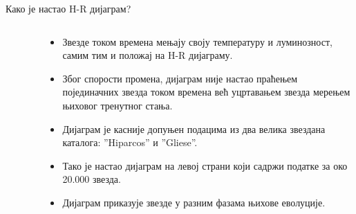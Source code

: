 \documentclass[aspectratio=169, xcolor=table, 10pt]{beamer}
\theoremstyle{definition}
\begin{document}
\begin{frame}{Како је настао H-R дијаграм?}
  \begin{columns}[T]
    \begin{column}{0.4\textwidth}
      \begin{figure}
        \centering
        \vspace{-1em}
      \end{figure}
    \end{column}
    \begin{column}{0.6\textwidth}
      \begin{itemize}
        \item Звезде током времена мењају своју температуру и луминозност, самим тим и положај на H-R дијаграму.
        \item Због спорости промена, дијаграм није настао праћењем појединачних звезда током времена већ уцртавањем звезда мерењем њиховог тренутног стања.
        \item Дијаграм је касније допуњен подацима из два велика звездана каталога: ”Hiparcos” и ”Gliese”.
        \item Тако је настао дијаграм на левој страни који садржи податке за око 20.000 звезда.
        \item Дијаграм приказује звезде у разним фазама њихове еволуције.
      \end{itemize}
    \end{column}
  \end{columns}
\end{frame}
\end{document}
